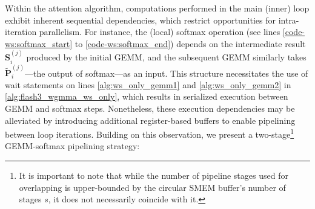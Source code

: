 Within the attention algorithm, computations performed in the main (inner) loop exhibit inherent sequential dependencies, which restrict opportunities for intra-iteration parallelism. For instance, the (local) softmax operation (see lines \ref{code-ws:softmax_start} to \ref{code-ws:softmax_end}) depends on the intermediate result $\mathbf{S}_i^{(j)}$ produced by the initial GEMM, and the subsequent GEMM similarly takes $\widetilde{\mathbf{P}}_i^{(j)}$—the output of softmax—as an input. This structure necessitates the use of wait statements on lines \ref{alg:ws_only_gemm1} and \ref{alg:ws_only_gemm2} in \cref{alg:flash3_wgmma_ws_only}, which results in serialized execution between GEMM and softmax steps. Nonetheless, these execution dependencies may be alleviated by introducing additional register-based buffers to enable pipelining between loop iterations. Building on this observation, we present a two-stage\footnote{It is important to note that while the number of pipeline stages used for overlapping is upper-bounded by the circular SMEM buffer’s number of stages $s$, it does not necessarily coincide with it.} GEMM-softmax pipelining strategy:

